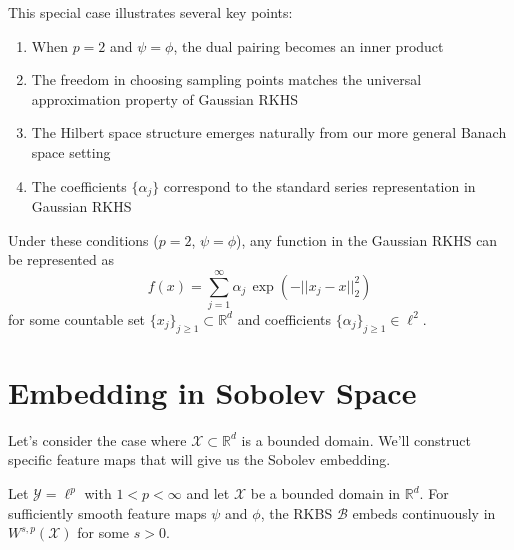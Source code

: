 \begin{remark}
This special case illustrates several key points:
\begin{enumerate}
\item When $p=2$ and $\psi = \phi$, the dual pairing becomes an inner product
\item The freedom in choosing sampling points matches the universal approximation property of Gaussian RKHS
\item The Hilbert space structure emerges naturally from our more general Banach space setting
\item The coefficients $\{\alpha_j\}$ correspond to the standard series representation in Gaussian RKHS
\end{enumerate}
\end{remark}

\begin{corollary}
Under these conditions ($p=2$, $\psi = \phi$), any function in the Gaussian RKHS can be represented as
\begin{equation}
f(x) = \sum_{j=1}^\infty \alpha_j\, \exp(-||x_j-x||_2^2)
\end{equation}
for some countable set $\{x_j\}_{j\ge1} \subset \mathbb{R}^d$ and coefficients $\{\alpha_j\}_{j\ge1} \in \ell^2$.
\end{corollary}

\section{Embedding in Sobolev Space}

Let's consider the case where $\mathcal{X} \subset \mathbb{R}^d$ is a bounded domain. We'll construct specific feature maps that will give us the Sobolev embedding.

\begin{theorem}
Let $\mathcal{Y} = \ell^p$ with $1 < p < \infty$ and let $\mathcal{X}$ be a bounded domain in $\mathbb{R}^d$. For sufficiently smooth feature maps $\psi$ and $\phi$, the RKBS $\mathcal{B}$ embeds continuously in $W^{s,p}(\mathcal{X})$ for some $s > 0$.
\end{theorem}

